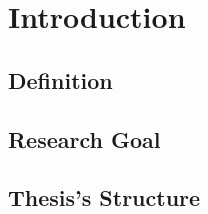 
\chapter{Introduction} %

\label{Chapter1} %


\section{Definition}


\section{Research Goal}


\section{Thesis's Structure}